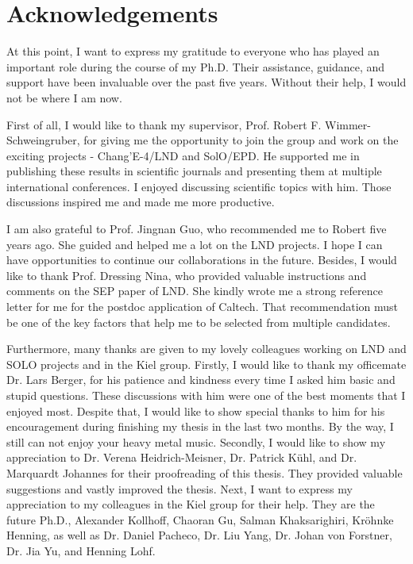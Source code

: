 \chapter*{Acknowledgements}

At this point, I want to express my gratitude to everyone who has played an important role during the course of my Ph.D. Their assistance, guidance, and support have been invaluable over the past five years. Without their help, I would not be where I am now.

First of all, I would like to thank my supervisor, Prof. Robert F. Wimmer-Schweingruber, for giving me the opportunity to join the group and work on the exciting projects - Chang'E-4/LND and SolO/EPD. He supported me in publishing these results in scientific journals and presenting them at multiple international conferences. I enjoyed discussing scientific topics with him. Those discussions inspired me and made me more productive.

I am also grateful to Prof. Jingnan Guo, who recommended me to Robert five years ago. She guided and helped me a lot on the LND projects. I hope I can have opportunities to continue our collaborations in the future. Besides, I would like to thank Prof. Dressing Nina, who provided valuable instructions and comments on the SEP paper of LND. She kindly wrote me a strong reference letter for me for the postdoc application of Caltech. That recommendation must be one of the key factors that help me to be selected from multiple candidates.

Furthermore, many thanks are given to my lovely colleagues working on LND and SOLO projects and in the Kiel group. Firstly, I would like to thank my officemate Dr. Lars Berger, for his patience and kindness every time I asked him basic and stupid questions. These discussions with him were one of the best moments that I enjoyed most. Despite that, I would like to show special thanks to him for his encouragement during finishing my thesis in the last two months. By the way, I still can not enjoy your heavy metal music. 
Secondly, I would like to show my appreciation to Dr. Verena Heidrich-Meisner, Dr. Patrick K\"{u}hl, and Dr. Marquardt Johannes for their proofreading of this thesis. They provided valuable suggestions and vastly improved the thesis.
Next, I want to express my appreciation to my colleagues in the Kiel group for their help. They are the future Ph.D., Alexander Kollhoff, Chaoran Gu, Salman Khaksarighiri, Kr\"{o}hnke Henning, as well as Dr. Daniel Pacheco, Dr. Liu Yang, Dr. Johan von Forstner, Dr. Jia Yu, and Henning Lohf.

